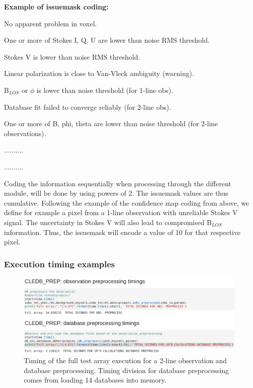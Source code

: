 \documentclass{article}
\begin{document}
\textbf{Example of issuemask coding:}
\begin{description}
    [font=\normalfont,leftmargin=0.6in,style=multiline]
    \item[0]
        No apparent problem in voxel.
    \item[1]
        One or more of Stokes I, Q, U are lower than noise RMS threshold.
    \item[2]
        Stokes V is lower than noise RMS threshold.
    \item[4]
        Linear polarization is close to Van-Vleck ambiguity (warning).  
    \item[8]
        B$_{LOS}$ or $\phi$ is lower than noise threshold (for 1-line obs).
    \item[16]
        Database fit failed to converge reliably (for 2-line obs).
    \item[32]
        One or more of B, phi, theta are lower than noise threshold (for 2-line observations).
    \item[64]
    ..........      
    \item[128]
    ..........               
\end{description}
Coding the information sequentially when processing through the different module, will be done by using powers of 2. The issuemask values are thus cumulative. Following the example of the confidence map coding from above, we define for example a pixel from a 1-line observation with unreliable Stokes V signal. The uncertainty in Stokes V will also lead to compromised B$_{LOS}$ information. Thus, the issuemask will encode a value of 10 for that respective pixel.


\newpage

\subsubsection*{Execution timing examples}



 \begin{figure}[!h]
\includegraphics[width=0.75\columnwidth]{figs/calc_time_prep.png}
\caption*{Timing of the full test array execution for a 2-line observation and database preprocessing. Timing division for database preprocessing comes from loading 14 databases into memory.}
\end{figure} 
\end{document}
